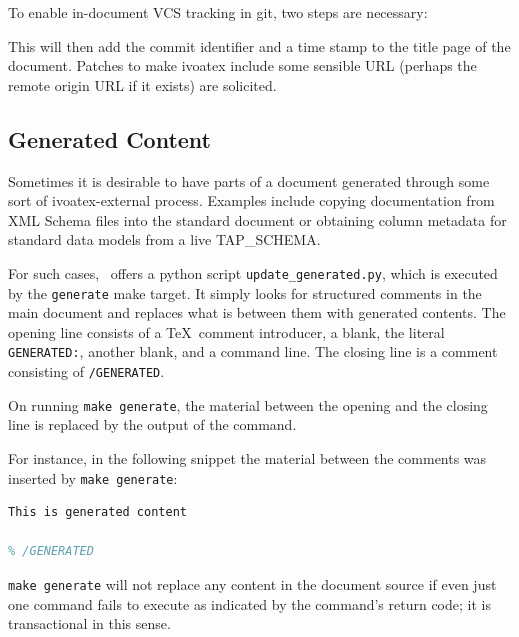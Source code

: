 \documentclass[11pt,a4paper]{ivoa}
\begin{document}
To enable in-document VCS tracking in git, two steps are necessary:


This will then add the commit identifier and a time stamp to the title
page of the document.  Patches to make ivoatex include some sensible URL
(perhaps the remote origin URL if it exists) are solicited.


\subsection{Generated Content}
\label{sect:generated}

Sometimes it is desirable to have parts of a document generated through
some sort of ivoatex-external process.  Examples include copying
documentation from XML Schema files into the standard document 
or obtaining column metadata for standard
data models from a live TAP\_SCHEMA.

For such cases, \ivoatex\ offers a python script
\texttt{update\_generated.py}, which is executed by the
\texttt{generate} make target.  It simply looks for structured comments
in the main document and replaces what is between them with generated
contents.  The opening line consists of a \TeX~comment introducer, a
blank, the literal \texttt{GENERATED:}, another blank, and a command
line.  The closing line is a comment consisting of \texttt{/GENERATED}.

On running \texttt{make generate}, the material between the opening and
the closing line is replaced by the output of the command.

For instance, in the following snippet the material between the comments
was inserted by \texttt{make generate}:

\begin{lstlisting}[language=TeX]
% GENERATED: echo This is generated content
This is generated content

% /GENERATED
\end{lstlisting}

\texttt{make generate} will not replace any content in the document source
if even just one command fails to execute as indicated by the
command's return code; it is transactional in this sense.
\end{document}

